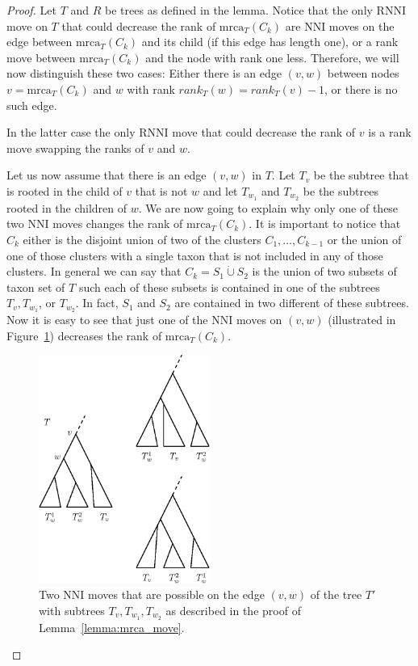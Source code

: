 \documentclass{amsart}
\newcommand{\mrca}{\mathrm{mrca}}
\newcommand{\nni}{\mathrm{NNI}}
\newcommand{\rnni}{\mathrm{RNNI}}
\begin{document}
\begin{proof}
Let $T$ and $R$ be trees as defined in the lemma.
Notice that the only $\rnni$ move on $T$ that could decrease the rank of $\mrca_T(C_k)$ are $\nni$ moves on the edge between $\mrca_T(C_k)$ and its child (if this edge has length one), or a rank move between $\mrca_T(C_k)$ and the node with rank one less.
Therefore, we will now distinguish these two cases:
Either there is an edge $(v,w)$ between nodes $v = \mrca_T(C_k)$ and $w$ with rank $rank_T(w) = rank_T(v) - 1$, or there is no such edge.

In the latter case the only $\rnni$ move that could decrease the rank of $v$ is a rank move swapping the ranks of $v$ and $w$.

Let us now assume that there is an edge $(v,w)$ in $T$.
Let $T_v$ be the subtree that is rooted in the child of $v$ that is not $w$ and let $T_{w_1}$ and $T_{w_2}$ be the subtrees rooted in the children of $w$.
We are now going to explain why only one of these two $\nni$ moves changes the rank of $\mrca_T(C_k)$.
It is important to notice that $C_k$ either is the disjoint union of two of the clusters $C_1, \ldots, C_{k-1}$ or the union of one of those clusters with a single taxon that is not included in any of those clusters.
In general we can say that $C_k = S_1 \dot\cup S_2$ is the union of two subsets of taxon set of $T$ such each of these subsets is contained in one of the subtrees $T_v, T_{w_1}$, or $T_{w_2}$.
In fact, $S_1$ and $S_2$ are contained in two different of these subtrees.
Now it is easy to see that just one of the $\nni$ moves on $(v,w)$ (illustrated in Figure~\ref{fig:mrca_move}) decreases the rank of $\mrca_T(C_k)$.

\begin{figure}[H]
\centering
\includegraphics[width=0.5\textwidth]{mrca_move}
\vspace{12pt}
\caption{Two $\nni$ moves that are possible on the edge $(v,w)$ of the tree $T'$ with subtrees $T_v, T_{w_1}, T_{w_2}$ as described in the proof of Lemma~\ref{lemma:mrca_move}.}
\label{fig:mrca_move}
\end{figure}
\end{proof}
\end{document}
